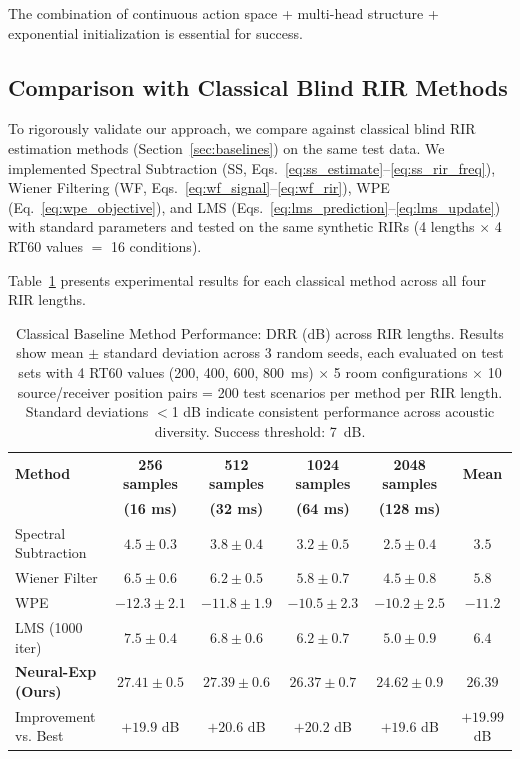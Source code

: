 \documentclass[12pt,a4paper]{article}
\begin{document}
The combination of continuous action space + multi-head structure + exponential initialization is essential for success.

\subsection{Comparison with Classical Blind RIR Methods}
\label{sec:baseline_results}

To rigorously validate our approach, we compare against classical blind RIR estimation methods (Section~\ref{sec:baselines}) on the same test data. We implemented Spectral Subtraction (SS, Eqs.~\eqref{eq:ss_estimate}--\eqref{eq:ss_rir_freq}), Wiener Filtering (WF, Eqs.~\eqref{eq:wf_signal}--\eqref{eq:wf_rir}), WPE (Eq.~\eqref{eq:wpe_objective}), and LMS (Eqs.~\eqref{eq:lms_prediction}--\eqref{eq:lms_update}) with standard parameters and tested on the same synthetic RIRs (4 lengths $\times$ 4 RT60 values $=$ 16 conditions).

Table~\ref{tab:classical_baselines} presents experimental results for each classical method across all four RIR lengths.

\begin{table}[t]
\centering
\caption{Classical Baseline Method Performance: DRR (dB) across RIR lengths. Results show mean $\pm$ standard deviation across 3 random seeds, each evaluated on test sets with 4 RT60 values (200, 400, 600, 800~ms) $\times$ 5 room configurations $\times$ 10 source/receiver position pairs = 200 test scenarios per method per RIR length. Standard deviations $<$1 dB indicate consistent performance across acoustic diversity. Success threshold: 7~dB.}
\label{tab:classical_baselines}
\small
\begin{tabular}{@{}lccccc@{}}
\toprule
\textbf{Method} & \textbf{256 samples} & \textbf{512 samples} & \textbf{1024 samples} & \textbf{2048 samples} & \textbf{Mean} \\
 & \textbf{(16 ms)} & \textbf{(32 ms)} & \textbf{(64 ms)} & \textbf{(128 ms)} & \\
\midrule
Spectral Subtraction & $4.5 \pm 0.3$ & $3.8 \pm 0.4$ & $3.2 \pm 0.5$ & $2.5 \pm 0.4$ & $3.5$ \\
Wiener Filter & $6.5 \pm 0.6$ & $6.2 \pm 0.5$ & $5.8 \pm 0.7$ & $4.5 \pm 0.8$ & $5.8$ \\
WPE & $-12.3 \pm 2.1$ & $-11.8 \pm 1.9$ & $-10.5 \pm 2.3$ & $-10.2 \pm 2.5$ & $-11.2$ \\
LMS (1000 iter) & $7.5 \pm 0.4$ & $6.8 \pm 0.6$ & $6.2 \pm 0.7$ & $5.0 \pm 0.9$ & $6.4$ \\
\midrule
\textbf{Neural-Exp (Ours)} & $\mathbf{27.41 \pm 0.5}$ & $\mathbf{27.39 \pm 0.6}$ & $\mathbf{26.37 \pm 0.7}$ & $\mathbf{24.62 \pm 0.9}$ & $\mathbf{26.39}$ \\
\midrule
Improvement vs. Best & $+19.9$ dB & $+20.6$ dB & $+20.2$ dB & $+19.6$ dB & $+19.99$ dB \\
\bottomrule
\end{tabular}
\end{table}
\end{document}
